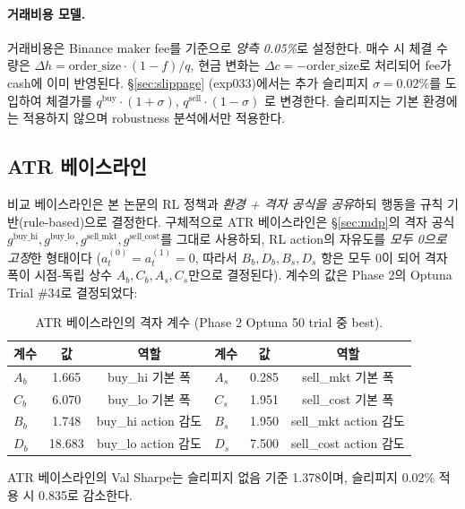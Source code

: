 \documentclass[11pt, a4paper]{article}
\begin{document}
\paragraph{거래비용 모델.}
거래비용은 Binance maker fee를 기준으로 \emph{양측 0.05\%}로 설정한다. 매수 시
체결 수량은 $\Delta h = \text{order\_size} \cdot (1 - f) / q$, 현금 변화는
$\Delta c = -\text{order\_size}$로 처리되어 fee가 cash에 이미 반영된다.
\S\ref{sec:slippage} (exp033)에서는 추가 슬리피지 $\sigma = 0.02\%$를 도입하여
체결가를 $q^{\mathrm{buy}} \cdot (1 + \sigma)$, $q^{\mathrm{sell}} \cdot (1 - \sigma)$
로 변경한다. 슬리피지는 기본 환경에는 적용하지 않으며 robustness 분석에서만
적용한다.

\subsection{ATR 베이스라인}
\label{sec:atr_baseline}

비교 베이스라인은 본 논문의 RL 정책과 \emph{환경 + 격자 공식을 공유}하되 행동을
규칙 기반(rule-based)으로 결정한다. 구체적으로 ATR 베이스라인은 \S\ref{sec:mdp}의
격자 공식 $g^{\mathrm{buy\_hi}}, g^{\mathrm{buy\_lo}}, g^{\mathrm{sell\_mkt}},
g^{\mathrm{sell\_cost}}$를 그대로 사용하되, RL action의 자유도를 \emph{모두 0으로
고정}한 형태이다 ($a_t^{(0)} = a_t^{(1)} = 0$, 따라서 $B_b, D_b, B_s, D_s$ 항은
모두 0이 되어 격자 폭이 시점-독립 상수 $A_b, C_b, A_s, C_s$만으로 결정된다). 계수의
값은 Phase 2의 Optuna Trial \#34로 결정되었다:

\begin{table}[!htbp]
\centering
\caption{ATR 베이스라인의 격자 계수 (Phase 2 Optuna 50 trial 중 best).}
\begin{tabular}{lcclcc}
\toprule
계수 & 값 & 역할 & 계수 & 값 & 역할 \\
\midrule
$A_b$ & 1.665 & buy\_hi 기본 폭 & $A_s$ & 0.285 & sell\_mkt 기본 폭 \\
$C_b$ & 6.070 & buy\_lo 기본 폭 & $C_s$ & 1.951 & sell\_cost 기본 폭 \\
$B_b$ & 1.748 & buy\_hi action 감도 & $B_s$ & 1.950 & sell\_mkt action 감도 \\
$D_b$ & 18.683 & buy\_lo action 감도 & $D_s$ & 7.500 & sell\_cost action 감도 \\
\bottomrule
\end{tabular}
\label{tab:atr_coefs}
\end{table}

ATR 베이스라인의 Val Sharpe는 슬리피지 없음 기준 1.378이며, 슬리피지 0.02\%
적용 시 0.835로 감소한다.
\end{document}
